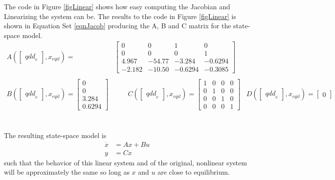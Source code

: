 \documentclass[12pt]{article}
\begin{document}
The code in Figure \ref{figLinear} shows how easy computing the Jacobian and Linearizing the system can be. The results to the code in Figure \ref{figLinear}  is shown in Equation Set \eqref{eqnJacob} producing the A, B and C matrix for the state-space model.
\begin{equation}
\begin{aligned}
\label{eqnJacob} 
A {\left(\begin{bmatrix} {qdd}_{e} \end{bmatrix}, x_{eqil}\right)} = & \begin{bmatrix} 0 &  0 &  1 & 0 \\ 0 & 0 & 0 & 1 \\ 4.967 & -54.77 & -3.284 & -0.6294\\ -2.182 &  -10.50 &  -0.6294 & -0.3085\end{bmatrix}
\\ \\
B {\left(\begin{bmatrix} {qdd}_{e} \end{bmatrix}, x_{eqil}\right)} = 
\begin{bmatrix} 0 \\ 0 \\ 3.284 \\0.6294\end{bmatrix}
& \qquad
C {\left(\begin{bmatrix} {qdd}_{e}\end{bmatrix}, x_{eqil}\right)} =
\begin{bmatrix} 1 & 0 & 0 & 0\\ 0 & 1 & 0 & 0 \\ 0 & 0 & 1 & 0 \\ 0 & 0 & 0 & 1 \end{bmatrix}
& 
D {\left(\begin{bmatrix} {qdd}_{e}\end{bmatrix}, x_{eqil}\right)} = 
\begin{bmatrix} 0\end{bmatrix}
\end{aligned}
\end{equation}
\\ \\
The resulting state-space model is
\begin{align*}
\dot{x} &= Ax+Bu \\
y &= Cx
\end{align*}
such that the behavior of this linear system and of the original, nonlinear system will be approximately the same so long as $x$ and $u$ are close to equilibrium.
\end{document}

